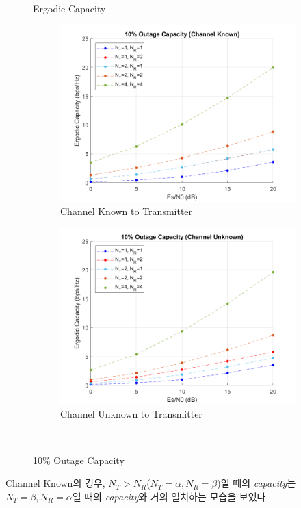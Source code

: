 \documentclass{article}
\begin{document}
\begin{figure}[H]
	\caption{Ergodic Capacity}
	\begin{subfigure}{0.5\textwidth}
		\centerline{\includegraphics[width=1\textwidth]{b_outage_ck.png}}
		\caption{Channel Known to Transmitter}
	\end{subfigure}%
	\begin{subfigure}{0.5\textwidth}
		\centerline{\includegraphics[width=1\textwidth]{b_outage_cu.png}}
		\caption{Channel Unknown to Transmitter}
	\end{subfigure}\\%
	\caption{10\% Outage Capacity}
\end{figure}
Channel Known의 경우, $N_T>N_R$($N_T=\alpha, N_R=\beta$)일 때의 \textsl{capacity}는 $N_T=\beta, N_R=\alpha$일 때의 \textsl{capacity}와 거의 일치하는 모습을 보였다.
\end{document}

